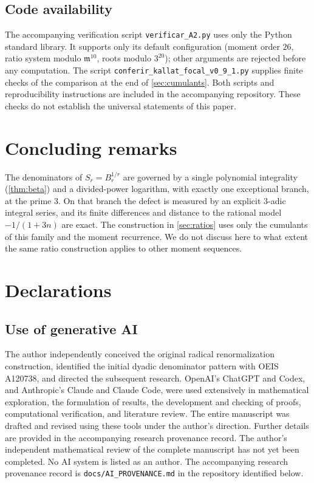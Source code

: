 \documentclass[11pt,reqno]{amsart}
\theoremstyle{definition}
\theoremstyle{remark}
\theoremstyle{plain}
\newcommand{\mm}{\mathfrak m}
\begin{document}
\subsection{Code availability}
The accompanying verification script \texttt{verificar\_A2.py} uses only the Python standard library. It supports only its default configuration (moment order $26$, ratio system modulo $\mm^{10}$, roots modulo $3^{20}$); other arguments are rejected before any computation. The script \texttt{conferir\_kallat\_focal\_v0\_9\_1.py} supplies finite checks of the comparison at the end of \cref{sec:cumulants}. Both scripts and reproducibility instructions are included in the accompanying repository. These checks do not establish the universal statements of this paper.

\section{Concluding remarks}
The denominators of $S_r=B_r^{1/r}$ are governed by a single polynomial integrality (\cref{thm:beta}) and a divided-power logarithm, with exactly one exceptional branch, at the prime $3$. On that branch the defect is measured by an explicit $3$-adic integral series, and its finite differences and distance to the rational model $-1/(1+3n)$ are exact. The construction in \cref{sec:ratios} uses only the cumulants of this family and the moment recurrence. We do not discuss here to what extent the same ratio construction applies to other moment sequences.

\section*{Declarations}

\subsection*{Use of generative AI}
The author independently conceived the original radical renormalization construction, identified the initial dyadic denominator pattern with OEIS A120738, and directed the subsequent research. OpenAI's ChatGPT and Codex, and Anthropic's Claude and Claude Code, were used extensively in mathematical exploration, the formulation of results, the development and checking of proofs, computational verification, and literature review. The entire manuscript was drafted and revised using these tools under the author's direction. Further details are provided in the accompanying research provenance record. The author's independent mathematical review of the complete manuscript has not yet been completed. No AI system is listed as an author. The accompanying research provenance record is \texttt{docs/AI\_PROVENANCE.md} in the repository identified below.
\end{document}
